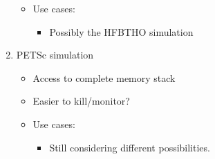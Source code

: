 \documentclass{article}
\begin{document}
\begin{enumerate}
\begin{itemize}
      \item Use cases:
        \begin{itemize}
          \item Possibly the HFBTHO simulation
        \end{itemize}
    \end{itemize}
  \item PETSc simulation
    \begin{itemize}
      \item Access to complete memory stack
      \item Easier to kill/monitor?
      \item Use cases:
        \begin{itemize}
          \item Still considering different possibilities.
        \end{itemize}
    \end{itemize}
\end{enumerate}

\clearpage
\end{document}

